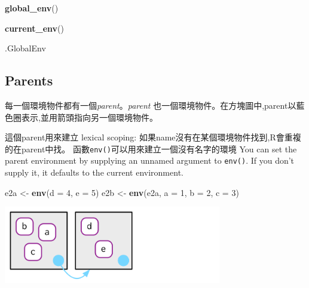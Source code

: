 \documentclass[]{book}
\newenvironment{Shaded}{\begin{snugshade}}{\end{snugshade}}
\newcommand{\DataTypeTok}[1]{\textcolor[rgb]{0.13,0.29,0.53}{#1}}
\newcommand{\DecValTok}[1]{\textcolor[rgb]{0.00,0.00,0.81}{#1}}
\newcommand{\KeywordTok}[1]{\textcolor[rgb]{0.13,0.29,0.53}{\textbf{#1}}}
\newcommand{\NormalTok}[1]{#1}
\newcommand{\StringTok}[1]{\textcolor[rgb]{0.31,0.60,0.02}{#1}}
\theoremstyle{definition}
\theoremstyle{definition}
\theoremstyle{definition}
\theoremstyle{remark}
\begin{document}
\begin{Shaded}
\begin{Highlighting}[]
\KeywordTok{global_env}\NormalTok{()}
\end{Highlighting}
\end{Shaded}

\begin{Shaded}
\begin{Highlighting}[]
\KeywordTok{current_env}\NormalTok{()}
\end{Highlighting}
\end{Shaded}

\begin{Shaded}
\begin{Highlighting}[]
\NormalTok{.GlobalEnv}
\end{Highlighting}
\end{Shaded}

\hypertarget{parents}{%
\subsection{Parents}\label{parents}}

每一個環境物件都有一個\emph{parent}。\emph{parent}
也一個環境物件。在方塊圖中,parent以藍色圈表示,並用箭頭指向另一個環境物件。

這個parent用來建立 lexical scoping:
如果name沒有在某個環境物件找到,R會重複的在parent中找。
函數\texttt{env()}可以用來建立一個沒有名字的環境 You can set the parent
environment by supplying an unnamed argument to \texttt{env()}. If you
don't supply it, it defaults to the current environment.

\begin{Shaded}
\begin{Highlighting}[]
\NormalTok{e2a <-}\StringTok{ }\KeywordTok{env}\NormalTok{(}\DataTypeTok{d =} \DecValTok{4}\NormalTok{, }\DataTypeTok{e =} \DecValTok{5}\NormalTok{)}
\NormalTok{e2b <-}\StringTok{ }\KeywordTok{env}\NormalTok{(e2a, }\DataTypeTok{a =} \DecValTok{1}\NormalTok{, }\DataTypeTok{b =} \DecValTok{2}\NormalTok{, }\DataTypeTok{c =} \DecValTok{3}\NormalTok{)}
\end{Highlighting}
\end{Shaded}

\begin{center}\includegraphics[width=3.74in]{diagrams/environments/parents} \end{center}
\end{document}
